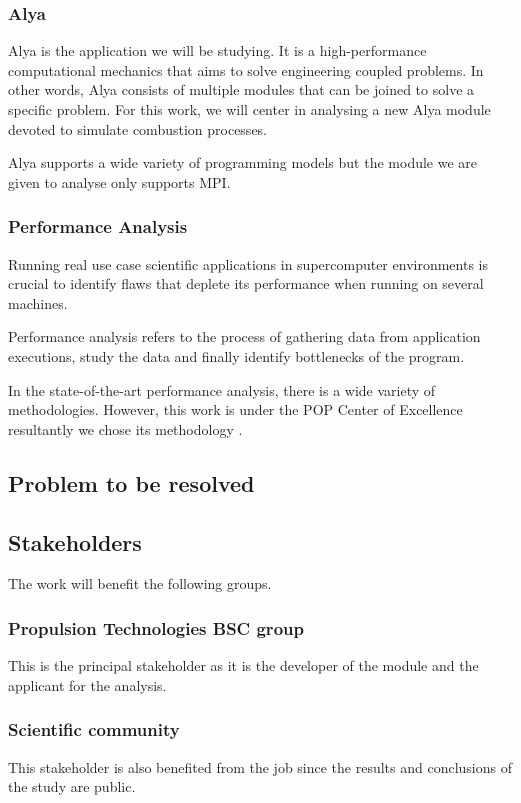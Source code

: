 \subsubsection{Alya}

\justify
Alya\cite{alya} is the application we will be studying.  It is a high-performance computational mechanics that aims to solve engineering coupled problems. In other words, Alya consists of multiple modules that can be joined to solve a specific problem. For this work, we will center in analysing a new Alya module devoted to simulate combustion processes.

\justify
Alya supports a wide variety of programming models but the module we are given to analyse only supports MPI.

\subsubsection{Performance Analysis}

\justify
Running real use case scientific applications in supercomputer environments is crucial to identify flaws that deplete its performance when running on several machines.

\justify
Performance analysis refers to the process of gathering data from application executions, study the data and finally identify bottlenecks of the program.

\justify
In the state-of-the-art performance analysis, there is a wide variety of methodologies. However, this work is under the POP Center of Excellence resultantly we chose its methodology \cite{popMethod}.

\subsection{Problem to be resolved}


\subsection{Stakeholders}

The work will benefit the following groups.

\subsubsection{Propulsion Technologies BSC group}

This is the principal stakeholder as it is the developer of the module and the applicant for the analysis.

\subsubsection{Scientific community}

This stakeholder is also benefited from the job since the results and conclusions of the study are public. 
\clearpage
